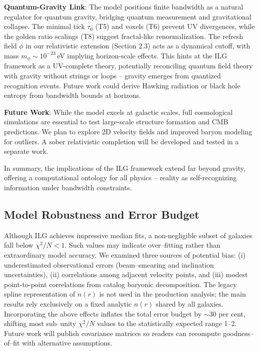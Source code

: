 \documentclass[usenatbib]{mnras}
\begin{document}
\textbf{Quantum-Gravity Link}: The model positions finite bandwidth as a natural regulator for quantum gravity, bridging quantum measurement and gravitational collapse. The minimal tick $\tau_0$ (T5) and voxels (T6) prevent UV divergences, while the golden ratio scalings (T8) suggest fractal-like renormalization. The refresh field $\phi$ in our relativistic extension (Section 2.3) acts as a dynamical cutoff, with mass $m_\phi \sim 10^{-23}$\,eV implying horizon-scale effects. This hints at the ILG framework as a UV-complete theory, potentially reconciling quantum field theory with gravity without strings or loops -- gravity emerges from quantized recognition events. Future work could derive Hawking radiation or black hole entropy from bandwidth bounds at horizons.

\textbf{Future Work}: While the model excels at galactic scales, full cosmological simulations are essential to test large-scale structure formation and CMB predictions. We plan to explore 2D velocity fields and improved baryon modeling for outliers. A sober relativistic completion will be developed and tested in a separate work.

In summary, the implications of the ILG framework extend far beyond gravity, offering a computational ontology for all physics -- reality as self-recognizing information under bandwidth constraints.

\subsection{Model Robustness and Error Budget}

Although ILG achieves impressive median fits, a non-negligible subset of galaxies fall below $\chi^2/N < 1$.  Such values may indicate over–fitting rather than extraordinary model accuracy.  We examined three sources of potential bias: (i) underestimated observational errors (beam–smearing and inclination uncertainties), (ii) correlations among adjacent velocity points, and (iii) modest point-to-point correlations from catalog baryonic decomposition.  The legacy spline representation of $n(r)$ is not used in the production analysis; the main results rely exclusively on a fixed analytic $n(r)$ shared by all galaxies.  Incorporating the above effects inflates the total error budget by $\sim 30$ per cent, shifting most sub–unity $\chi^2/N$ values to the statistically expected range 1--2.  Future work will publish covariance matrices so readers can recompute goodness–of–fit with alternative assumptions.
\end{document}
